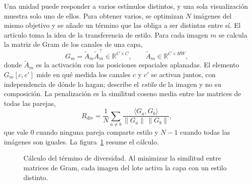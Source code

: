 \documentclass[11pt,a4paper]{article}
\begin{document}
Una unidad puede responder a varios estímulos distintos, y una sola
visualización muestra solo uno de ellos. Para obtener varios, se optimizan
$N$ imágenes del mismo objetivo y se añade un término que las obliga a ser
distintas entre sí. El artículo toma la idea de la transferencia de estilo.
Para cada imagen $m$ se calcula la matriz de Gram de los canales de una
capa,
\begin{equation}
G_m = \tilde{A}_m \tilde{A}_m^{\top} \in \mathbb{R}^{C \times C},
\qquad \tilde{A}_m \in \mathbb{R}^{C \times HW},
\end{equation}
donde $\tilde{A}_m$ es la activación con las posiciones espaciales
aplanadas. El elemento $G_m[c,c']$ mide en qué medida los canales $c$ y $c'$
se activan juntos, con independencia de dónde lo hagan; describe el
\emph{estilo} de la imagen y no su composición. La penalización es la
similitud coseno media entre las matrices de todas las parejas,
\begin{equation}
R_{\text{div}} = \frac{1}{N}\sum_{a \neq b}
\frac{\langle G_a, G_b \rangle}{\lVert G_a \rVert\, \lVert G_b \rVert},
\end{equation}
que vale 0 cuando ninguna pareja comparte estilo y $N-1$ cuando todas las
imágenes son iguales. La figura~\ref{fig:diversidad} resume el cálculo.

\begin{figure}[!htb]
\centering
{}
\caption{Cálculo del término de diversidad. Al minimizar la similitud entre
matrices de Gram, cada imagen del lote activa la capa con un estilo
distinto.}
\label{fig:diversidad}
\end{figure}
\end{document}
